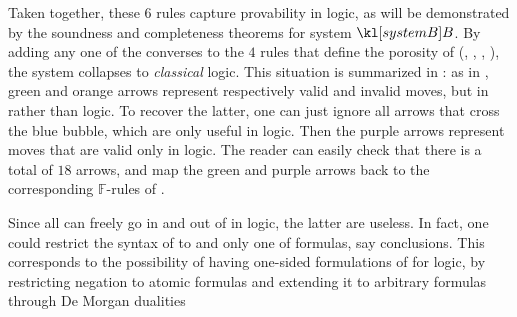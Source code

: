 \begin{description}
  Taken together, these $6$ rules capture provability in
  \emph{} logic, as will be demonstrated by the soundness and
  completeness theorems for system $\sysB$. By adding any one of the converses
  to the $4$ rules that define the porosity of   (, , ,
  ), the system collapses to \emph{classical} logic.
  This situation is summarized in : as in
  , green and orange arrows represent respectively valid
  and invalid moves, but in  rather than  logic.
  To recover the latter, one can just ignore all arrows that cross the blue
  bubble, which are only useful in  logic. Then the purple
  arrows represent moves that are valid only in  logic. The reader can
  easily check that there is a total of $18$ arrows, and map the green and
  purple arrows back to the corresponding $\mathbb{F}$-rules of
  .

  \begin{remark}
    Since all  can freely go in and out of   in 
    logic, the latter are useless. In fact, one could restrict the syntax of
     to   and only one  of formulas, say
    conclusions. This corresponds to the possibility of having one-sided
    formulations of  for  logic, by restricting negation
    to atomic formulas and extending it to arbitrary formulas through De Morgan
    dualities
  \end{remark}
  

\end{description}
